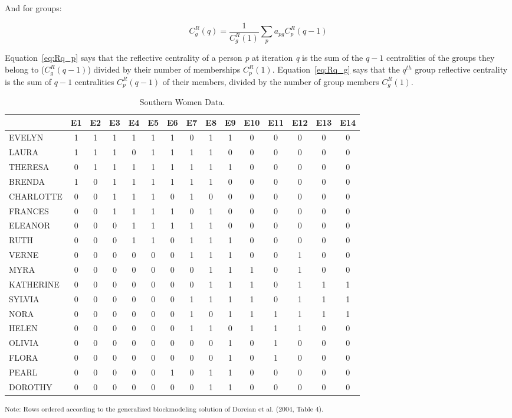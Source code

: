\documentclass[a4paper,fleqn]{cas-sc}
\begin{document}
And for groups:

\begin{equation}
   C^R_g(q) = \frac{1}{C^R_g(1)}\sum_p a_{pg}C^R_p(q-1)
   \label{eq:Rq_g}
\end{equation}

Equation~\ref{eq:Rq_p} says that the reflective centrality of a person \textit{p} at iteration \textit{q} is the sum of the $q-1$ centralities of the groups they belong to ($C^R_g(q-1)$) divided by their number of memberships $C^{R}_p(1)$. Equation~\ref{eq:Rq_g} says that the $q^{th}$ group reflective centrality is the sum of $q-1$ centralities $C^R_p(q-1)$ of their members, divided by the number of group members $C^R_g(1)$.

\begin{table}
\caption{Southern Women Data.}
\label{tab:southern}
\begin{tabular}[]{lcccccccccccccc}
\hline
 & E1 & E2 & E3 & E4 & E5 & E6 & E7 & E8 & E9 & E10 & E11 & E12 & E13 & E14 \\
 \hline
EVELYN & 1 & 1 & 1 & 1 & 1 & 1 & 0 & 1 & 1 & 0 & 0 & 0 & 0 & 0 \\
LAURA & 1 & 1 & 1 & 0 & 1 & 1 & 1 & 1 & 0 & 0 & 0 & 0 & 0 & 0 \\
THERESA & 0 & 1 & 1 & 1 & 1 & 1 & 1 & 1 & 1 & 0 & 0 & 0 & 0 & 0 \\
BRENDA & 1 & 0 & 1 & 1 & 1 & 1 & 1 & 1 & 0 & 0 & 0 & 0 & 0 & 0 \\
CHARLOTTE & 0 & 0 & 1 & 1 & 1 & 0 & 1 & 0 & 0 & 0 & 0 & 0 & 0 & 0 \\
FRANCES & 0 & 0 & 1 & 1 & 1 & 1 & 0 & 1 & 0 & 0 & 0 & 0 & 0 & 0 \\
ELEANOR & 0 & 0 & 0 & 1 & 1 & 1 & 1 & 1 & 0 & 0 & 0 & 0 & 0 & 0 \\
RUTH & 0 & 0 & 0 & 1 & 1 & 0 & 1 & 1 & 1 & 0 & 0 & 0 & 0 & 0 \\
VERNE & 0 & 0 & 0 & 0 & 0 & 0 & 1 & 1 & 1 & 0 & 0 & 1 & 0 & 0 \\
MYRA & 0 & 0 & 0 & 0 & 0 & 0 & 0 & 1 & 1 & 1 & 0 & 1 & 0 & 0 \\
KATHERINE & 0 & 0 & 0 & 0 & 0 & 0 & 0 & 1 & 1 & 1 & 0 & 1 & 1 & 1 \\
SYLVIA & 0 & 0 & 0 & 0 & 0 & 0 & 1 & 1 & 1 & 1 & 0 & 1 & 1 & 1 \\
NORA & 0 & 0 & 0 & 0 & 0 & 0 & 1 & 0 & 1 & 1 & 1 & 1 & 1 & 1 \\
HELEN & 0 & 0 & 0 & 0 & 0 & 0 & 1 & 1 & 0 & 1 & 1 & 1 & 0 & 0 \\
OLIVIA & 0 & 0 & 0 & 0 & 0 & 0 & 0 & 0 & 1 & 0 & 1 & 0 & 0 & 0 \\
FLORA & 0 & 0 & 0 & 0 & 0 & 0 & 0 & 0 & 1 & 0 & 1 & 0 & 0 & 0 \\
PEARL & 0 & 0 & 0 & 0 & 0 & 1 & 0 & 1 & 1 & 0 & 0 & 0 & 0 & 0 \\
DOROTHY & 0 & 0 & 0 & 0 & 0 & 0 & 0 & 1 & 1 & 0 & 0 & 0 & 0 & 0 \\
\hline
\end{tabular}
\textsuperscript{Note: Rows ordered according to the generalized
blockmodeling solution of Doreian et al. (2004, Table 4).} \\
\end{table}
\end{document}
